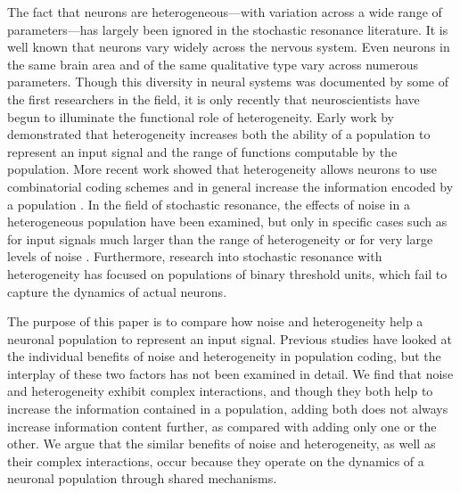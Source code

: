 \documentclass[letterpaper,11pt]{article}
\begin{document}
The fact that neurons are heterogeneous---with variation across a wide range of parameters---has largely been ignored in the stochastic resonance literature. It is well known that neurons vary widely across the nervous system. Even neurons in the same brain area and of the same qualitative type vary across numerous parameters. Though this diversity in neural systems was documented by some of the first researchers in the field, it is only recently that neuroscientists have begun to illuminate the functional role of heterogeneity. Early work by \cite{Eliasmith2003} demonstrated that heterogeneity increases both the ability of a population to represent an input signal and the range of functions computable by the population. More recent work showed that heterogeneity allows neurons to use combinatorial coding schemes \citep{Osborne2008} and in general increase the information encoded by a population \citep{Shamir2006,Chelaru2008,Padmanabhan2010,Ecker2011}. In the field of stochastic resonance, the effects of noise in a heterogeneous population have been examined, but only in specific cases such as for input signals much larger than the range of heterogeneity \citep{Stocks2000} or for very large levels of noise \citep{McDonnell2006}. Furthermore, research into stochastic resonance with heterogeneity has focused on populations of binary threshold units, which fail to capture the dynamics of actual neurons.

The purpose of this paper is to compare how noise and heterogeneity help a neuronal population to represent an input signal. Previous studies have looked at the individual benefits of noise and heterogeneity in population coding, but the interplay of these two factors has not been examined in detail. We find that noise and heterogeneity exhibit complex interactions, and though they both help to increase the information contained in a population, adding both does not always increase information content further, as compared with adding only one or the other. We argue that the similar benefits of noise and heterogeneity, as well as their complex interactions, occur because they operate on the dynamics of a neuronal population through shared mechanisms.
\end{document}
